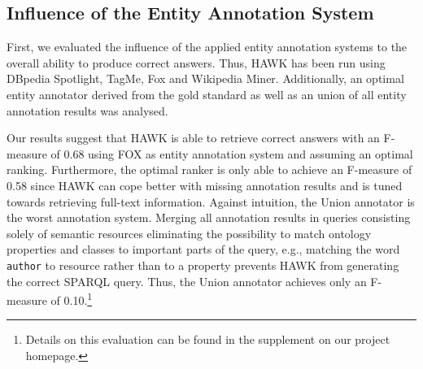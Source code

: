 \subsection{Influence of the Entity Annotation System}
First, we evaluated the influence of the applied entity annotation systems to the overall ability to produce correct answers.
Thus, HAWK has been run using DBpedia Spotlight, TagMe, Fox and Wikipedia Miner. %
Additionally, an optimal entity annotator derived from the gold standard as well as an union of all entity annotation results was analysed. %

Our results suggest that HAWK is able to retrieve correct answers with an F-measure of 0.68 using FOX as entity annotation system and assuming an optimal ranking.
Furthermore, the optimal ranker is only able to achieve an F-measure of 0.58 since HAWK can cope better with missing annotation results and is tuned towards retrieving full-text information.
Against intuition, the Union annotator is the worst annotation system. 
Merging all annotation results in queries consisting solely of semantic resources eliminating the possibility to match ontology properties and classes to important parts of the query, e.g., matching the word \texttt{author} to resource rather than to a property prevents HAWK from generating the correct SPARQL query.
Thus, the Union annotator achieves only an F-measure of 0.10.\footnote{Details on this evaluation can be found in the supplement on our project homepage.}


